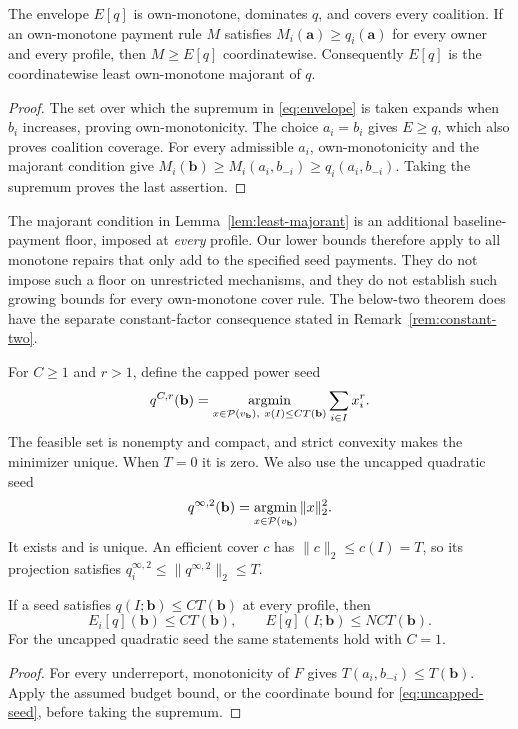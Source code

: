 \begin{lemma}
\label{lem:least-majorant}
The envelope $E[q]$ is own-monotone, dominates $q$, and covers every
coalition.  If an own-monotone payment rule $M$ satisfies
$M_i(\mathbf a)\ge q_i(\mathbf a)$ for every owner and every profile, then
$M\ge E[q]$ coordinatewise.  Consequently $E[q]$ is the coordinatewise
least own-monotone majorant of $q$.
\end{lemma}
\begin{proof}
The set over which the supremum in \eqref{eq:envelope} is taken expands
when $b_i$ increases, proving own-monotonicity.  The choice $a_i=b_i$
gives $E\ge q$, which also proves coalition coverage.  For every admissible
$a_i$, own-monotonicity and the majorant condition give
$M_i(\mathbf b)\ge M_i(a_i,b_{-i})\ge q_i(a_i,b_{-i})$.
Taking the supremum proves the last assertion.
\end{proof}

The majorant condition in Lemma~\ref{lem:least-majorant} is an additional
baseline-payment floor, imposed at \emph{every} profile.  Our lower bounds
therefore apply to all monotone repairs that only add to the specified
seed payments.  They do not impose such a floor on unrestricted mechanisms,
and they do not establish such growing bounds for every own-monotone cover rule.
The below-two theorem does have the separate constant-factor consequence
stated in Remark~\ref{rem:constant-two}.

For $C\ge1$ and $r>1$, define the capped power seed
\begin{equation}
 q^{C,r}(\mathbf b)=
 \mathop{\rm argmin}_{x\in\mathcal P(v_{\mathbf b}),\ x(I)\le C T(\mathbf b)}
       \sum_{i\in I}x_i^r.
 \label{eq:capped-seed}
\end{equation}
The feasible set is nonempty and compact, and strict convexity makes the
minimizer unique.  When $T=0$ it is zero.  We also use the uncapped quadratic
seed
\begin{equation}
 q^{\infty,2}(\mathbf b)=\mathop{\rm argmin}_{x\in\mathcal P(v_{\mathbf b})}
       \|x\|_2^2.
 \label{eq:uncapped-seed}
\end{equation}
It exists and is unique.  An efficient cover $c$ has
$\|c\|_2\le c(I)=T$, so its projection satisfies
$q_i^{\infty,2}\le\|q^{\infty,2}\|_2\le T$.

\begin{proposition}
\label{prop:trivial-upper}
If a seed satisfies $q(I;\mathbf b)\le C T(\mathbf b)$ at every profile,
then
\[
 E_i[q](\mathbf b)\le C T(\mathbf b),\qquad
 E[q](I;\mathbf b)\le NC T(\mathbf b).
\]
For the uncapped quadratic seed the same statements hold with $C=1$.
\end{proposition}
\begin{proof}
For every underreport, monotonicity of $F$ gives
$T(a_i,b_{-i})\le T(\mathbf b)$.  Apply the assumed budget bound, or the
coordinate bound for \eqref{eq:uncapped-seed}, before taking the supremum.
\end{proof}

